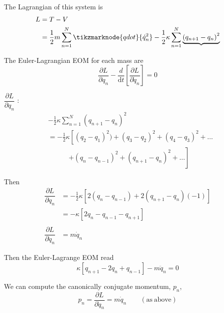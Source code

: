 \documentclass{article}
\begin{document}
\noindent The Lagrangian of this system is
\begin{align*}
    L &= T - V \\
    &= \frac{1}{2} m \sum_{n=1}^N \tikzmarknode{qdot}{\dot{q}_n^2} - \frac{1}{2} \kappa \sum_{n=1}^N \underbrace{ {(q_{n+1} - q_n)}^2 }
\end{align*}


\noindent The Euler-Lagrangian EOM for each mass are
\begin{equation}
    \dfrac{ \partial L }{ \partial q_n} -  \dfrac{d}{ \mathrm{d} t} \left[\dfrac{ \partial L }{ \partial \dot {q}_n } \right] = 0
\end{equation}

\noindent $\dfrac{ \partial L }{ \partial q_n}$ :
\begin{align*}
    & -\tfrac{1}{2} \kappa \sum_{n=1}^N (q_{n+1} - q_n)^2 \\
    &= -\tfrac{1}{2} \kappa \left[(q_{2} - q_1)^2) + (q_{3} - q_2)^2 + (q_{4} - q_3)^2 + \dots \right. \\
    &\qquad \quad \left. + (q_{n} - q_{n-1})^2 + (q_{n+1} - q_n)^2 + \dots \right]
\end{align*}

\noindent Then
\begin{align*}
    \dfrac{ \partial L }{ \partial q_n} &= -\tfrac{1}{2} \kappa \left[ 2 (q_{n} - q_{n-1}) + 2 (q_{n+1} - q_n)(-1)  \right] \\
    &= - \kappa \left[2 q_{n} - q_{n-1} - q_{n+1}  \right] \\ \\
    \dfrac{ \partial L }{ \partial \dot q_n} &= m\dot{q}_n
\end{align*}


\noindent Then the Euler-Lagrange EOM read
\begin{equation*}
    \kappa \left[ q_{n+1} -2 q_{n} + q_{n-1} \right] - m \ddot{q}_n = 0
\end{equation*}

\noindent We can compute the canonically conjugate momentum, $p_n$,
\begin{equation*}
  p_n =  \dfrac{ \partial L }{ \partial \dot q_n}  = m \dot{q}_n \qquad \mathrm{(as ~ above)} 
\end{equation*}
\end{document}
